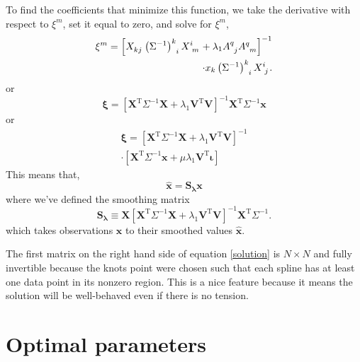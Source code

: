 \documentclass[twocol]{ametsoc}
\begin{document}
To find the coefficients that minimize this function, we take the derivative with respect to $\xi^m$, set it equal to zero, and solve for $\xi^m$,
\begin{equation}
\begin{split}
\xi^m = \left[ X\indices{_k_j} \left(\Sigma^{-1}\right)\indices{^k_i}  X\indices{^i_m} + \lambda_1 {A}\indices{^q_j}{A}\indices{^q_m} \right]^{-1} \\
\cdot x_k \left(\Sigma^{-1}\right)\indices{^k_i}   X\indices{^i_j}.
\end{split}
\label{solution}
\end{equation}
or
\begin{equation}
\mathbf{\xi} = \left[ \mathbf{X}^{\textrm{T}} \Sigma^{-1} \mathbf{X} + \lambda_1 \mathbf{V}^{\textrm{T}} \mathbf{V} \right]^{-1} \mathbf{X}^{\textrm{T}} \Sigma^{-1} \mathbf{x}
\end{equation}
or
\begin{equation}
\begin{split}
\mathbf{\xi} = \left[ \mathbf{X}^{\textrm{T}} \Sigma^{-1} \mathbf{X} + \lambda_1 \mathbf{V}^{\textrm{T}} \mathbf{V} \right]^{-1}  \\
\cdot \left[ \mathbf{X}^{\textrm{T}} \Sigma^{-1} \mathbf{x} +  \mu \lambda_1 \mathbf{V}^{\textrm{T}} \mathbf{\iota} \right]
\end{split}
\end{equation}
This means that,
\begin{equation}
\mathbf{\hat{x}} = \mathbf{S_\lambda} \mathbf{x}
\end{equation}
where we've defined the smoothing matrix
\begin{equation}
\label{smoothing-operator}
\mathbf{S_\lambda} \equiv \mathbf{X} \left[ \mathbf{X}^{\textrm{T}} \Sigma^{-1} \mathbf{X} + \lambda_1 \mathbf{V}^{\textrm{T}} \mathbf{V} \right]^{-1} \mathbf{X}^{\textrm{T}} \Sigma^{-1}.
\end{equation}
which takes observations $\mathbf{x}$ to their smoothed values $\mathbf{\hat{x}}$.

The first matrix on the right hand side of equation \ref{solution} is $N\times N$ and fully invertible because the knots point were chosen such that each spline has at least one data point in its nonzero region. This is a nice feature because it means the solution will be well-behaved even if there is no tension.


%
\section{Optimal parameters} \label{optimal_parameter}
%
\end{document}
